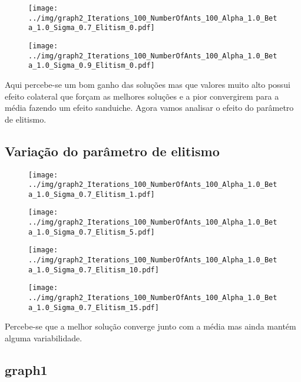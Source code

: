 \begin{figure}[H]
  \centering
  \texttt{[image: ../img/graph2\_Iterations\_100\_NumberOfAnts\_100\_Alpha\_1.0\_Beta\_1.0\_Sigma\_0.7\_Elitism\_0.pdf]}
\end{figure}

\begin{figure}[H]
  \centering
  \texttt{[image: ../img/graph2\_Iterations\_100\_NumberOfAnts\_100\_Alpha\_1.0\_Beta\_1.0\_Sigma\_0.9\_Elitism\_0.pdf]}
\end{figure}

Aqui percebe-se um bom ganho das soluções mas que valores muito alto possui efeito colateral que forçam
as melhores soluções e a pior convergirem para a média fazendo um efeito sanduiche. Agora vamos analisar
o efeito do parâmetro de elitismo.

\subsection*{Variação do parâmetro de elitismo}

\begin{figure}[H]
  \centering
  \texttt{[image: ../img/graph2\_Iterations\_100\_NumberOfAnts\_100\_Alpha\_1.0\_Beta\_1.0\_Sigma\_0.7\_Elitism\_1.pdf]}
\end{figure}

\begin{figure}[H]
  \centering
  \texttt{[image: ../img/graph2\_Iterations\_100\_NumberOfAnts\_100\_Alpha\_1.0\_Beta\_1.0\_Sigma\_0.7\_Elitism\_5.pdf]}
\end{figure}

\begin{figure}[H]
  \centering
  \texttt{[image: ../img/graph2\_Iterations\_100\_NumberOfAnts\_100\_Alpha\_1.0\_Beta\_1.0\_Sigma\_0.7\_Elitism\_10.pdf]}
\end{figure}

\begin{figure}[H]
  \centering
  \texttt{[image: ../img/graph2\_Iterations\_100\_NumberOfAnts\_100\_Alpha\_1.0\_Beta\_1.0\_Sigma\_0.7\_Elitism\_15.pdf]}
\end{figure}

Percebe-se que a melhor solução converge junto com a média mas ainda mantém alguma variabilidade.

\subsection{\textbf{graph1}}


